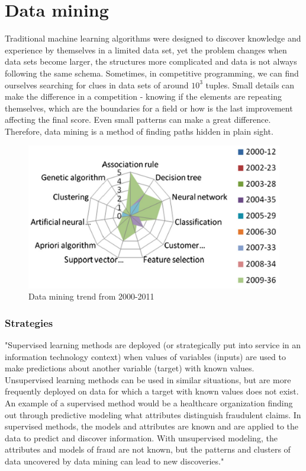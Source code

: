 \section{Data mining}

Traditional machine learning algorithms were designed to discover knowledge and experience by themselves in a limited data set, yet the problem changes when data sets become larger, the structures more complicated and data is not always following the same schema. Sometimes, in competitive programming, we can find ourselves searching for clues in data sets of around $10^3$ tuples. Small details can make the difference in a competition - knowing if the elements are repeating themselves, which are the boundaries for a field or how is the last improvement affecting the final score. Even small patterns can make a great difference. Therefore, data mining is a method of finding paths hidden in plain sight.

\begin{figure}[ht!]
    \centering
    \includegraphics[width = 15.5cm]{figures/dmt}
    \caption{Data mining trend from 2000-2011 \cite{LIAO201211303}}
    \label{fig:dmt}
\end{figure}

\subsubsection{Strategies}

"Supervised learning methods are deployed (or strategically put into service in an information technology context) when values of variables (inputs) are used to make predictions about another variable (target) with known values. Unsupervised learning methods can be used in similar situations, but are more frequently deployed on data for which a target with known values does not exist. An example of a supervised method would be a healthcare organization finding out through predictive modeling what attributes distinguish fraudulent claims. In supervised methods, the models and attributes are known and are applied to the data to predict and discover information. With unsupervised modeling, the attributes and models of fraud are not known, but the patterns and clusters of data uncovered by data mining can lead to new discoveries." \cite{hoho}

